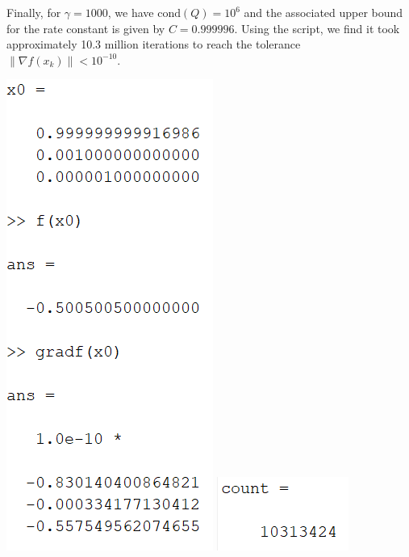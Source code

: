 \documentclass{article}
\begin{document}
Finally, for $\gamma = 1000$, we have $\text{cond}(Q) = 10^6$ and the associated upper bound for the rate constant is given by $C = 0.999996$. Using the script, we find it took approximately 10.3 million iterations to reach the tolerance $\| \nabla f(x_k) \| < 10^{-10}$.
\begin{center}
    \includegraphics[scale = 0.9]{gamma1000vals}
    \newline
    \includegraphics{gamma1000count}
    \newline\newline
\end{center}
\end{document}
